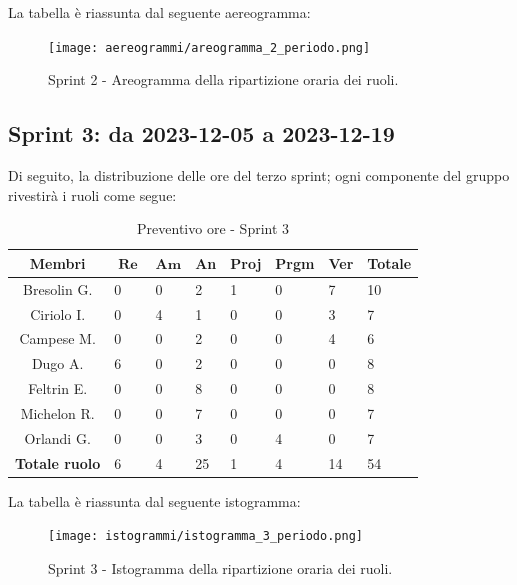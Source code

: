\documentclass[10pt, a4paper]{article}
\begin{document}
La tabella è riassunta dal seguente aereogramma:
 \begin{figure}[H]
        \centering        
        \texttt{[image: aereogrammi/areogramma\_2\_periodo.png]}
        \caption{Sprint 2 - Areogramma della ripartizione oraria dei ruoli. }
    \end{figure}


\subsection{Sprint 3: da 2023-12-05 a 2023-12-19}
Di seguito, la distribuzione delle ore del terzo sprint; ogni componente del gruppo rivestirà i ruoli come segue:
\begin{table}[H]
\begin{tabularx}{\textwidth}{c|X|X|X|X|X|X|X}
        \textbf{Membri} & $\operatorname{\textbf{Re}}$ & $\mathrm{\textbf{Am}}$ & \textbf{An} & \textbf{Proj} & \textbf{Prgm} & \textbf{Ver} & \textbf{Totale} \\
        \hline Bresolin G. & 0 & 0 & 2 & 1 & 0 & \cellcolor{primarycolor}7 & 10 \\
        \hline Ciriolo I.  & 0 & \cellcolor{primarycolor}4 & 1 & 0 & 0 & 3 & 7 \\
        \hline Campese M.  & 0 & 0 & \cellcolor{primarycolor}2 & 0 & 0 & 4 & 6 \\
        \hline Dugo A.     & \cellcolor{primarycolor}6 & 0 & 2 & 0 & 0 & 0 & 8 \\
        \hline Feltrin E.  & 0 & 0 & \cellcolor{primarycolor}8 & 0 & 0 & 0 & 8 \\
        \hline Michelon R. & 0 & 0 & \cellcolor{primarycolor}7 & 0 & 0 & 0 & 7 \\
        \hline Orlandi G.  & 0 & 0 & 3 & 0 & \cellcolor{primarycolor}4 & 0 & 7 \\
        \hline
        \textbf{Totale ruolo} & 6 & 4 & 25 & 1 & 4 & 14 & 54 
    \end{tabularx}
    \caption{Preventivo ore - Sprint 3}
    \end{table}

La tabella è riassunta dal seguente istogramma:
 \begin{figure}[H]
        \centering        
        \texttt{[image: istogrammi/istogramma\_3\_periodo.png]}
        \caption{Sprint 3 - Istogramma della ripartizione oraria dei ruoli. }
    \end{figure}
\end{document}
